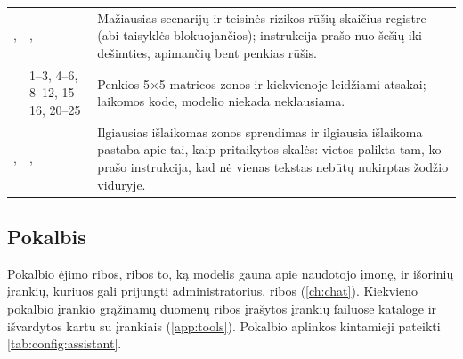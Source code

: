 \begin{xltabular}{\textwidth}{@{}L{44mm}L{19mm}Y@{}}
,  & ,  & Mažiausias scenarijų ir teisinės rizikos rūšių skaičius registre (abi taisyklės blokuojančios); instrukcija prašo nuo šešių iki dešimties, apimančių bent penkias rūšis. \\
 & 1--3, 4--6, 8--12, 15--16, 20--25 & Penkios 5×5 matricos zonos ir kiekvienoje leidžiami atsakai; laikomos kode, modelio niekada neklausiama. \\
,  & ,  & Ilgiausias išlaikomas zonos sprendimas ir ilgiausia išlaikoma pastaba apie tai, kaip pritaikytos skalės: vietos palikta tam, ko prašo instrukcija, kad nė vienas tekstas nebūtų nukirptas žodžio viduryje. \\
\end{xltabular}


\subsection{Pokalbis}\label{sec:config:chat}

Pokalbio ėjimo ribos, ribos to, ką modelis gauna apie naudotojo įmonę, ir išorinių įrankių,
kuriuos gali prijungti administratorius, ribos (\cref{ch:chat}). Kiekvieno pokalbio įrankio
grąžinamų duomenų ribos įrašytos įrankių failuose kataloge  ir išvardytos kartu su
įrankiais (\cref{app:tools}). Pokalbio aplinkos kintamieji pateikti \cref{tab:config:assistant}.

